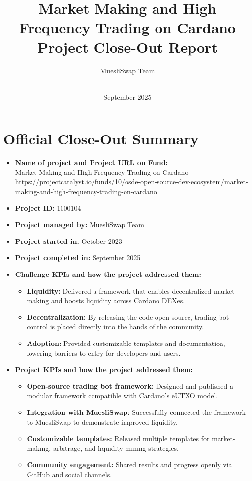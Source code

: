 \documentclass[11pt]{article}
\title{\textbf{Market Making and High Frequency Trading on Cardano \\--- Project Close-Out Report ---}}
\author{MuesliSwap Team}
\date{\\September 2025}
\begin{document}
\maketitle

\section*{Official Close-Out Summary}
\begin{itemize}[leftmargin=1cm]
    \item \textbf{Name of project and Project URL on Fund:}\\
    Market Making and High Frequency Trading on Cardano \\
    {\scriptsize\url{https://projectcatalyst.io/funds/10/osde-open-source-dev-ecosystem/market-making-and-high-frequency-trading-on-cardano}}

    \item \textbf{Project ID:} 1000104

    \item \textbf{Project managed by:} MuesliSwap Team

    \item \textbf{Project started in:} October 2023

    \item \textbf{Project completed in:} September 2025

    \item \textbf{Challenge KPIs and how the project addressed them:}
    \begin{itemize}
        \item \textbf{Liquidity:} Delivered a framework that enables decentralized market-making and boosts liquidity across Cardano DEXes.
        \item \textbf{Decentralization:} By releasing the code open-source, trading bot control is placed directly into the hands of the community.
        \item \textbf{Adoption:} Provided customizable templates and documentation, lowering barriers to entry for developers and users.
    \end{itemize}

    \item \textbf{Project KPIs and how the project addressed them:}
    \begin{itemize}
        \item \textbf{Open-source trading bot framework:} Designed and published a modular framework compatible with Cardano’s eUTXO model.
        \item \textbf{Integration with MuesliSwap:} Successfully connected the framework to MuesliSwap to demonstrate improved liquidity.
        \item \textbf{Customizable templates:} Released multiple templates for market-making, arbitrage, and liquidity mining strategies.
        \item \textbf{Community engagement:} Shared results and progress openly via GitHub and social channels.
    \end{itemize}


\end{itemize}
\end{document}
